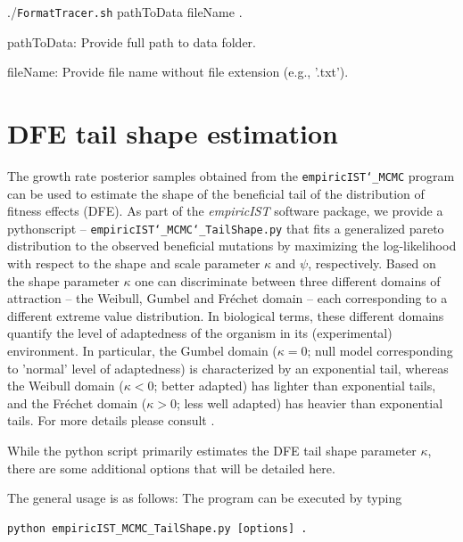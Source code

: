 \documentclass[12pt,a4paper]{scrartcl}
\begin{document}
\vspace{0.05cm}
./\texttt{FormatTracer.sh} pathToData fileName .
\vspace{0.05cm}

pathToData: Provide full path to data folder.
\vspace{0.05cm}

fileName: Provide file name without file extension (e.g., '.txt').
\vspace{0.05cm}



\section{DFE tail shape estimation}

The growth rate posterior samples obtained from the \texttt{empiricIST\char`_MCMC} program can be used to estimate the shape of the beneficial tail of the distribution of fitness effects (DFE).
As part of the \emph{empiricIST} software package, we provide a python\linebreak script -- \texttt{empiricIST\char`_MCMC\char`_TailShape.py} that fits a generalized pareto distribution to the observed beneficial mutations by maximizing the log-likelihood with respect to the shape and scale parameter $\kappa$ and $\psi$, respectively. Based on the shape parameter $\kappa$ one can discriminate between three different domains of attraction -- the Weibull, Gumbel and Fr\'{e}chet domain -- each corresponding to a different extreme value distribution. In biological terms, these different domains quantify the level of adaptedness of the organism in its (experimental) environment. In particular, the Gumbel domain ($\kappa=0$; null model corresponding to 'normal' level of adaptedness) is characterized by an exponential tail, whereas the Weibull domain ($\kappa<0$; better adapted) has lighter than exponential tails, and the Fr\'{e}chet domain ($\kappa>0$; less well adapted) has heavier than exponential tails. For more details please consult \cite{BeiRW07}.

While the python script primarily estimates the DFE tail shape parameter $\kappa$, there are some additional options that will be detailed here.

The general usage is as follows: The program can be executed by typing

\begin{lstlisting}
python empiricIST_MCMC_TailShape.py [options] .
\end{lstlisting}
\end{document}
